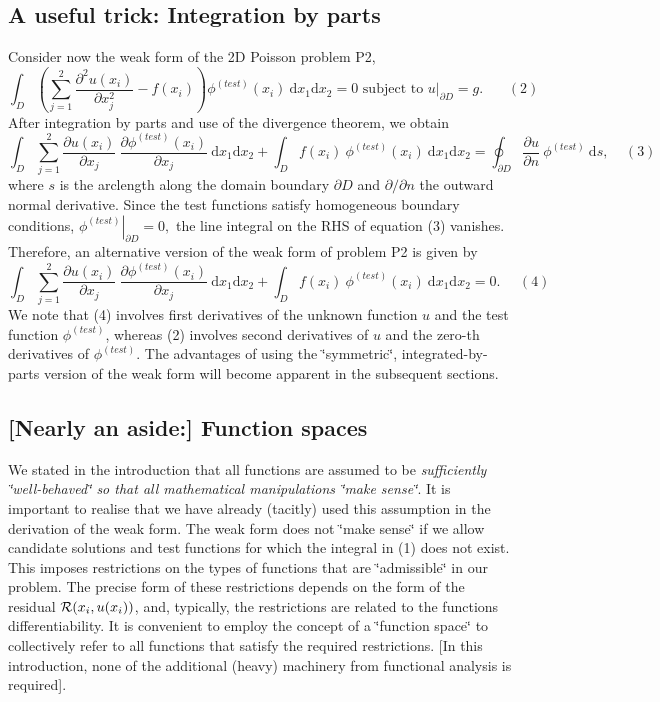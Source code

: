 \hypertarget{index_int_by_parts_1}{}\subsection{A useful trick\+: Integration by parts}\label{index_int_by_parts_1}
Consider now the weak form of the 2D Poisson problem P2, \[ \int_D \left( \sum_{j=1}^2 \frac{\partial^2 u(x_i)}{\partial x_j^2} - f(x_i) \right) \phi^{(test)}(x_i) \ \mbox{d}x_1 \mbox{d}x_2 =0 \mbox{\ \ \ \ subject to\ \ \ \ } u|_{\partial D}=g. \ \ \ \ \ \ \ \ (2) \] After integration by parts and use of the divergence theorem, we obtain \[ \int_D \sum_{j=1}^2 \frac{\partial u(x_i)}{\partial x_j} \ \frac{\partial \phi^{(test)}(x_i)}{\partial x_j} \ \mbox{d}x_1 \mbox{d}x_2 + \int_D f(x_i) \ \phi^{(test)}(x_i) \ \mbox{d}x_1 \mbox{d}x_2 = \oint_{\partial D} \frac{\partial u}{\partial n} \ \phi^{(test)} \ \mbox{d}s, \ \ \ \ \ (3) \] where $s$ is the arclength along the domain boundary $ \partial D$ and $ \partial/\partial n$ the outward normal derivative. Since the test functions satisfy homogeneous boundary conditions, $ \left. \phi^{(test)} \right|_{\partial D} = 0, $ the line integral on the R\+HS of equation (3) vanishes. Therefore, an alternative version of the weak form of problem P2 is given by \[ \int_D \sum_{j=1}^2 \frac{\partial u(x_i)}{\partial x_j} \ \frac{\partial \phi^{(test)}(x_i)}{\partial x_j} \ \mbox{d}x_1 \mbox{d}x_2 + \int_D f(x_i) \ \phi^{(test)}(x_i) \ \mbox{d}x_1 \mbox{d}x_2 = 0. \ \ \ \ \ \ (4) \] We note that (4) involves first derivatives of the unknown function $ u $ and the test function $ \phi^{(test)} $, whereas (2) involves second derivatives of $ u $ and the zero-\/th derivatives of $ \phi^{(test)} $. The advantages of using the \char`\"{}symmetric\char`\"{}, integrated-\/by-\/parts version of the weak form will become apparent in the subsequent sections.



\hypertarget{index_function_spaces}{}\subsection{\mbox{[}\+Nearly an aside\+:\mbox{]} Function spaces}\label{index_function_spaces}
We stated in the introduction that all functions are assumed to be {\itshape  sufficiently \char`\"{}well-\/behaved\char`\"{} so that all mathematical manipulations \char`\"{}make sense\char`\"{}}. It is important to realise that we have already (tacitly) used this assumption in the derivation of the weak form. The weak form does not \char`\"{}make sense\char`\"{} if we allow candidate solutions and test functions for which the integral in (1) does not exist. This imposes restrictions on the types of functions that are \char`\"{}admissible\char`\"{} in our problem. The precise form of these restrictions depends on the form of the residual ${\cal R}(x_i,u(x_i))$, and, typically, the restrictions are related to the functions\textquotesingle{} differentiability. It is convenient to employ the concept of a \char`\"{}function space\char`\"{} to collectively refer to all functions that satisfy the required restrictions. \mbox{[}In this introduction, none of the additional (heavy) machinery from functional analysis is required\mbox{]}.

